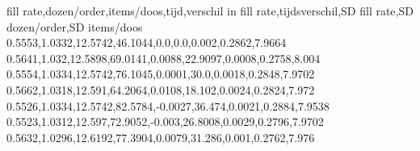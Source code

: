 fill rate,dozen/order,items/doos,tijd,verschil in fill rate,tijdsverschil,SD fill rate,SD dozen/order,SD items/doos
0.5553,1.0332,12.5742,46.1044,0.0,0.0,0.002,0.2862,7.9664
0.5641,1.032,12.5898,69.0141,0.0088,22.9097,0.0008,0.2758,8.004
0.5554,1.0334,12.5742,76.1045,0.0001,30.0,0.0018,0.2848,7.9702
0.5662,1.0318,12.591,64.2064,0.0108,18.102,0.0024,0.2824,7.972
0.5526,1.0334,12.5742,82.5784,-0.0027,36.474,0.0021,0.2884,7.9538
0.5523,1.0312,12.597,72.9052,-0.003,26.8008,0.0029,0.2796,7.9702
0.5632,1.0296,12.6192,77.3904,0.0079,31.286,0.001,0.2762,7.976
